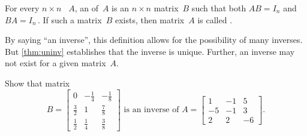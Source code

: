 \begin{definition}[inverse] \label{def:invertible} 
For every \(n\times n\) ~\(A\), an  of~\(A\) is an \(n\times n\) matrix~\(B\) such that both \(AB=I_n\) and \(BA=I_n\)\,.
If such a matrix~\(B\) exists, then matrix~\(A\) is called .
\end{definition}

By saying ``an inverse'', this definition allows for the possibility of many inverses. 
But \cref{thm:uninv} establishes that the inverse is unique.
Further, an inverse may not exist for a given matrix~\(A\).

\begin{example} \label{eg:a3x3inv}
Show that matrix
\begin{equation*}
B=\begin{bmatrix} 0&-\frac14&-\frac18\\\frac32&1&\frac78\\ \frac12&\frac14&\frac38 \end{bmatrix}
\text{ is an inverse of }
A=\begin{bmatrix} 1&-1&5\\-5&-1&3\\2&2&-6 \end{bmatrix}.
\end{equation*}


\end{example}
